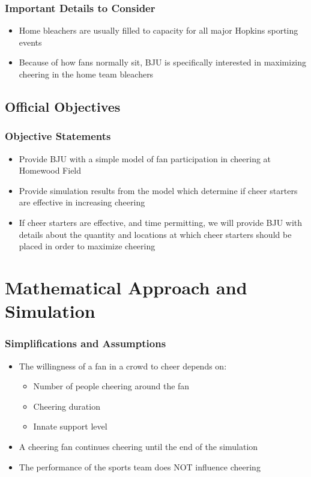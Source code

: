 \documentclass[compress,handout,10pt]{beamer}
\let\olditem\item
\renewcommand{\item}{\setlength{\itemsep}{0.5\baselineskip}\olditem}
\begin{document}
\begin{frame}
	\frametitle{Important Details to Consider}
	\begin{itemize}
		\item Home bleachers are usually filled to capacity for all major Hopkins sporting events
		\item Because of how fans normally sit, BJU is specifically interested in maximizing cheering in the home team bleachers
	\end{itemize}
\end{frame}

\subsection{Official Objectives}

\begin{frame}
	\frametitle{Objective Statements}
		\begin{itemize}
			\item Provide BJU with a simple model of fan participation in cheering at Homewood Field
			\item Provide simulation results from the model which determine if cheer starters are effective in increasing cheering
			\item If cheer starters are effective, and time permitting, we will provide BJU with details about the quantity and locations at which cheer starters should be placed in order to maximize cheering
		\end{itemize}
\end{frame}

\section{Mathematical Approach and Simulation}
\begin{frame}
\frametitle{Simplifications and Assumptions}
\begin{itemize}
	\item The willingness of a fan in a crowd to cheer depends on:
	\begin{itemize}
	 	\item Number of people cheering around the fan
	 	\item Cheering duration
	 	\item Innate support level
	\end{itemize}
	\item A cheering fan continues cheering until the end of the simulation
	\item The performance of the sports team does NOT influence cheering
	\end{itemize}
\end{frame}
\end{document}
